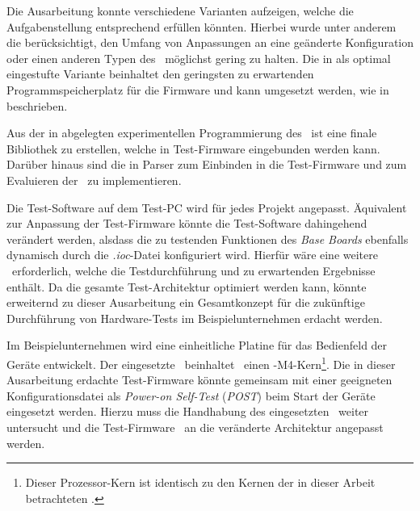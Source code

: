 
Die Ausarbeitung konnte verschiedene Varianten aufzeigen, welche die Aufgabenstellung entsprechend  erfüllen könnten. Hierbei wurde unter anderem die berücksichtigt, den Umfang von Anpassungen an eine geänderte Konfiguration oder einen anderen Typen des \MCUDZ\ möglichst gering zu halten.
Die in  als optimal eingestufte Variante beinhaltet den geringsten zu erwartenden Programmspeicherplatz für die Firmware und kann umgesetzt werden, wie in  beschrieben.

Aus der in  abgelegten experimentellen Programmierung des \COL\ ist eine finale Bibliothek zu erstellen, welche in Test-Firmware eingebunden werden kann. Darüber hinaus sind die in  Parser zum Einbinden in die Test-Firmware und zum Evaluieren der \ConfigF\ zu implementieren. 

Die Test-Software auf dem Test-PC wird für jedes Projekt angepasst. Äquivalent zur Anpassung der Test-Firmware könnte die Test-Software dahingehend verändert werden, alsdass die zu testenden Funktionen des \textit{Base Boards} ebenfalls dynamisch durch die \textit{.ioc}-Datei konfiguriert wird. Hierfür wäre eine weitere \ConfigF\ erforderlich, welche die Testdurchführung und zu erwartenden Ergebnisse enthält.
Da die gesamte Test-Architektur optimiert werden kann, könnte erweiternd zu dieser Ausarbeitung ein Gesamtkonzept für die zukünftige Durchführung von Hardware-Tests im Beispielunternehmen erdacht werden.


Im Beispielunternehmen wird eine einheitliche Platine für das Bedienfeld der Geräte entwickelt. Der eingesetzte \uProc\ beinhaltet \ua\ einen \Cortex-M4-Kern\footnote{Dieser Prozessor-Kern ist identisch zu den Kernen der in dieser Arbeit betrachteten \MCUDZ.}. Die in dieser Ausarbeitung erdachte Test-Firmware könnte gemeinsam mit einer geeigneten Konfigurationsdatei als \textit{Power-on Self-Test} (\textit{POST}) beim Start der Geräte eingesetzt werden. Hierzu muss die Handhabung des eingesetzten \uProc\ weiter untersucht und die Test-Firmware \uU\ an die veränderte Architektur angepasst werden.

